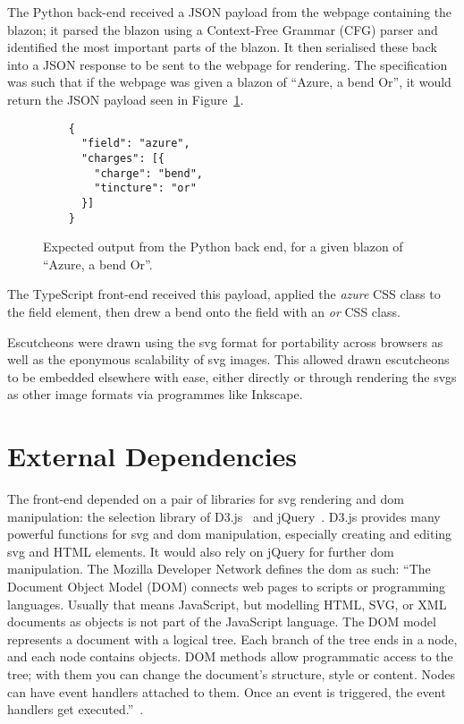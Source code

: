 \documentclass[nobib, a4paper, twoside, justified]{tufte-book}
\makeatletter
\newcommand{\svg}{\gls{svg}\@\xspace}
\newcommand{\svgs}{\glspl{svg}\@\xspace}
\newcommand{\dom}{\gls{dom}\@\xspace}
\makeatother
\begin{document}
The Python back-end received a JSON payload from the webpage containing the blazon; it parsed the
blazon using a Context-Free Grammar (CFG) parser and identified the most important parts of the
blazon. It then serialised these back into a JSON response to be sent to the webpage for rendering.
The specification was such that if the webpage was given a blazon of ``Azure, a bend Or'', it would
return the JSON payload seen in Figure~\ref{fig:expected_output}.

\begin{figure}
  \begin{verbatim}
    {
      "field": "azure",
      "charges": [{
        "charge": "bend",
        "tincture": "or"
      }]
    }
  \end{verbatim}
  \caption{Expected output from the Python back end, for a given blazon of ``Azure, a bend Or''.}%
  \label{fig:expected_output}
\end{figure}

The TypeScript front-end received this payload, applied the \textit{azure} CSS class to the field
element, then drew a bend onto the field with an \textit{or} CSS class.

Escutcheons were drawn using the \svg{} format for portability across browsers as well as the
eponymous scalability of \svg{} images. This allowed drawn escutcheons to be embedded elsewhere
with ease, either directly or through rendering the \svgs{} as other image formats via programmes
like Inkscape.

\section{External Dependencies}%
\label{sec:external_dependencies}

The front-end depended on a pair of libraries for \svg{} rendering and \dom{} manipulation: the
selection library of D3.js~\autocite{d3js} and jQuery~\autocite{jquery}. D3.js provides many
powerful functions for \svg{} and \dom{} manipulation, especially creating and editing \svg{} and
HTML elements. It would also rely on jQuery for further \dom{} manipulation. The Mozilla Developer
Network defines the \dom{} as such: ``The Document Object Model (DOM) connects web pages to scripts
or programming languages. Usually that means JavaScript, but modelling HTML, SVG, or XML documents
as objects is not part of the JavaScript language. The DOM model represents a document with a
logical tree. Each branch of the tree ends in a node, and each node contains objects. DOM methods
allow programmatic access to the tree; with them you can change the document's structure, style or
content. Nodes can have event handlers attached to them. Once an event is triggered, the event
handlers get executed.''~\autocite{mdn_dom}.
\end{document}

